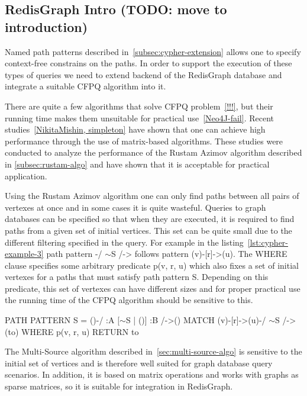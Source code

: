 \subsection{RedisGraph Intro (TODO: move to introduction)}

Named path patterns described in~\autoref{subsec:cypher-extension} allows one to specify context-free constrains on the paths. In order to support the execution of these types of queries we need to extend backend of the RedisGraph database and integrate a suitable CFPQ algorithm into it. 

There are quite a few algorithms that solve CFPQ problem~\ref{!!!}, but their running time makes them unsuitable for practical use~\ref{Neo4J-fail}. Recent studies~\ref{NikitaMishin, simpleton} have shown that one can achieve high performance through the use of matrix-based algorithms. These studies were conducted to analyze the performance of the Rustam Azimov algorithm described in \autoref{subsec:rustam-algo} and have shown that it is acceptable for practical application.

Using the Rustam Azimov algorithm one can only find paths between all pairs of vertexes at once and in some cases it is quite wasteful. Queries to graph databases can be specified so that when they are executed, it is required to find paths from a given set of initial vertices. This set can be quite small due to the different filtering specified in the query. For example in the listing~\ref{lst:cypher-example-3} path pattern \colorbox{blue!10}{-/ $\sim$S /->} follows pattern \colorbox{blue!10}{(v)-[r]->(u)}. The WHERE clause specifies some arbitrary predicate \colorbox{blue!10}{p(v, r, u)} which also fixes a set of initial vertexes for a paths that must satisfy path pattern \colorbox{blue!10}{S}. Depending on this predicate, this set of vertexes can have different sizes and for proper practical use the running time of the CFPQ algorithm should be sensitive to this.

\begin{algorithm}
\begin{algorithmic}[1]
\caption{...}
\label{lst:cypher-example-3}
\State PATH PATTERN S = ()-/ :A [$\sim$S | ()] :B /->()
\State MATCH (v)-[r]->(u)-/ $\sim$S /->(to)
\State WHERE p(v, r, u)
\State RETURN to
\end{algorithmic}
\end{algorithm}

The Multi-Source algorithm described in~\autoref{sec:multi-source-algo} is sensitive to the initial set of vertices and is therefore well suited for graph database query scenarios. In addition, it is based on matrix operations and works with graphs as sparse matrices, so it is suitable for integration in RedisGraph.


